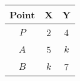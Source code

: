\begin{tabular}[12pt]{ |c| c| c|}
    \hline
    \textbf{Point} & \textbf{X} & \textbf{Y}\\ 
    \hline
    $P$ & 2 & 4 \\
    \hline 
    $A$ & 5 & $k$\\
    \hline
    $B$ & $k$ & 7\\
    \hline   
    \end{tabular}